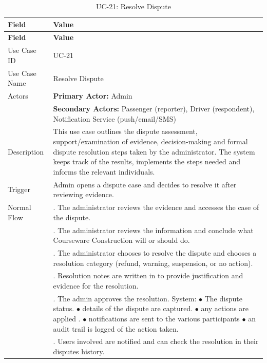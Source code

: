 \begin{longtable}{|>{\raggedright\arraybackslash}p{4cm}|>{\raggedright\arraybackslash}p{11cm}|}
\caption{UC-21: Resolve Dispute}
\label{tab:uc-21} \\
\hline
\rowcolor{lightgray!30}
\textbf{Field} & \textbf{Value} \\
\hline
\endfirsthead
\hline
\rowcolor{lightgray!30}
\textbf{Field} & \textbf{Value} \\
\hline
\endhead
\hline
\endfoot
\hline
\endlastfoot
Use Case ID & UC-21 \\
\hline
Use Case Name & Resolve Dispute \\
\hline
Actors & \textbf{Primary Actor:} Admin \\
& \textbf{Secondary Actors:} Passenger (reporter), Driver (respondent), Notification Service (push/email/SMS) \\
\hline
Description & This use case outlines the dispute assessment, support/examination of evidence, decision-making and formal dispute resolution steps taken by the administrator. The system keeps track of the results, implements the steps needed and informs the relevant individuals. \\
\hline
Trigger & Admin opens a dispute case and decides to resolve it after reviewing evidence. \\
\hline
Normal Flow & 1. The administrator reviews the evidence and accesses the case of the dispute. \\
& 2. The administrator reviews the information and conclude what Courseware Construction will or should do. \\
& 3. The administrator chooses to resolve the dispute and chooses a resolution category (refund, warning, suspension, or no action). \\
& 4. Resolution notes are written in to provide justification and evidence for the resolution. \\
& 5. The admin approves the resolution. System: \newline $\bullet$ The dispute status. \newline $\bullet$ details of the dispute are captured. \newline $\bullet$ any actions are applied . \newline $\bullet$ notifications are sent to the various participants \newline $\bullet$ an audit trail is logged of the action taken. \\
& 6. Users involved are notified and can check the resolution in their disputes history. \\

\end{longtable}
